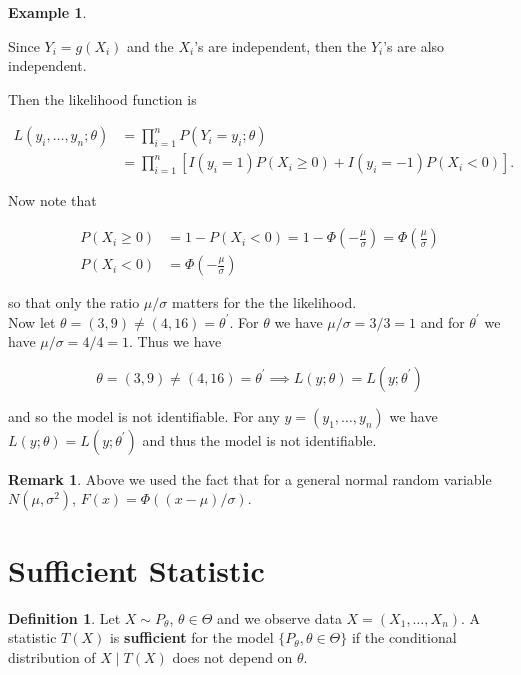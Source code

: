 \documentclass[12pt]{article}
\theoremstyle{definition}
\newtheorem*{definition}{Definition}
\newtheorem*{example}{Example}
\newtheorem*{remark}{Remark}
\begin{document}
\begin{example}
\begin{enumerate}[label = Part \arabic*)]
Since $Y_i = g(X_i)$ and the $X_i$'s are independent, then the $Y_i$'s
are also independent.

Then the likelihood function is

\begin{align*}
L(y_i, \ldots, y_n; \theta) &= \prod_{i = 1}^n P(Y_i = y_i; \theta) \\
&= \prod_{i = 1}^n \left[ I(y_i = 1) P(X_i \geq 0) + I(y_i = -1)P(X_i < 0) \right].
\end{align*}

Now note that

\begin{align*}
P(X_i \geq 0) &= 1 - P(X_i < 0) = 1 - \Phi \left( -\frac{\mu}{\sigma} \right) = \Phi \left( \frac{\mu}{\sigma} \right)\\
P(X_i < 0) &= \Phi \left( -\frac{\mu}{\sigma} \right)
\end{align*}

so that only the ratio $\mu/\sigma$ matters for the the likelihood.\\

Now let $\theta = (3, 9) \neq (4, 16) = \theta^{\prime}$. For $\theta$ we
have $\mu/\sigma = 3/3 = 1$ and for $\theta^{\prime}$ we have
$\mu/\sigma = 4/4 = 1$. Thus we have

$$ \theta = (3,9) \neq (4,16) = \theta^{\prime} \implies L(y; \theta) = L(y; \theta^{\prime}) $$

and so the model is not identifiable. For any $y = (y_1, \ldots, y_n)$ we
have $L(y; \theta) = L(y; \theta^{\prime})$ and thus the model is
not identifiable.


\begin{remark}
Above we used the fact that for a general normal random variable $N(\mu, \sigma^2)$,
$F(x) = \Phi((x - \mu)/\sigma)$.
\end{remark}
\end{enumerate}
\end{example}

\section{Sufficient Statistic}

\begin{definition}
Let $X \sim P_{\theta}$, $\theta \in \Theta$ and we observe data 
$X = (X_1, \ldots, X_n)$. A statistic $T(X)$ is \textbf{sufficient} for
the model $\{P_{\theta}, \theta \in \Theta \}$ if the conditional 
distribution of $X \mid T(X)$ does not depend on $\theta$.
\end{definition}
\end{document}
